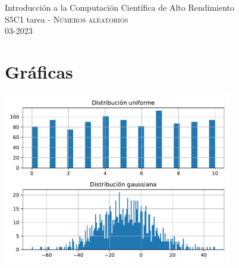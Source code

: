 \documentclass[11pt,letterpaper]{article}
\begin{document}
\begin{center}
{\Large Introducción a la Computación Científica de Alto Rendimiento} \\
S5C1 tarea - \textsc{Números aleatorios}\\
03-2023\\
\end{center}

\noindent
\section{Gráficas}
\begin{center}
\includegraphics[width=10cm]{histogramas.pdf} 
\end{center}
\end{document}
